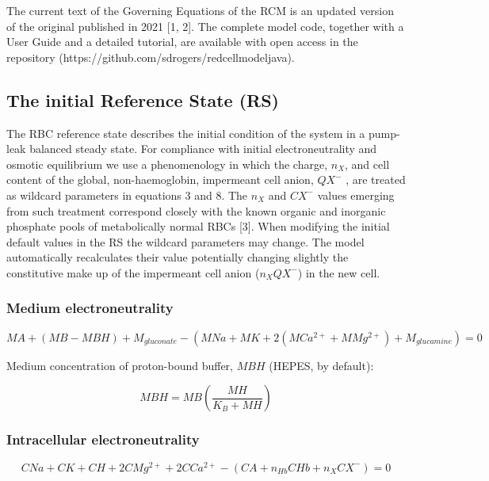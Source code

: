 \documentclass[a4paper]{article}
\newcommand{\med}[1]{M#1}
\newcommand{\cell}[1]{C#1}
\newcommand{\MA}{\med{A}}
\newcommand{\MB}{\med{B}}
\newcommand{\MBH}{\med{BH}}
\newcommand{\MGluca}{M_{glucamine}}
\newcommand{\MNa}{\med{Na}}
\newcommand{\MK}{\med{K}}
\newcommand{\MCatp}{\med{Ca^{2+}}}
\newcommand{\MMgtp}{\med{Mg^{2+}}}
\newcommand{\MGluco}{M_{gluconate}}
\newcommand{\MH}{\med{H}}
\newcommand{\KB}{K_B}
\newcommand{\CNa}{\cell{Na}}
\newcommand{\CK}{\cell{K}}
\newcommand{\CH}{\cell{H}}
\newcommand{\CMgtp}{\cell{Mg^{2+}}}
\newcommand{\CCatp}{\cell{Ca^{2+}}}
\newcommand{\CA}{\cell{A}}
\newcommand{\nHb}{n_{Hb}}
\newcommand{\CHb}{\cell{Hb}}
\newcommand{\nX}{n_{X}}
\newcommand{\CXm}{\cell{X^{-}}}
\newcommand{\QXm}{QX^{-}}
\begin{document}
The current text of the Governing Equations of the RCM is an updated version of the original published in 2021 [1, 2]. The complete model code, together with a User Guide and a detailed tutorial, are available 
 with open access in the repository (https://github.com/sdrogers/redcellmodeljava).   


\subsection{The initial Reference State (RS)}

The RBC reference state describes the initial condition of the system in
a pump-leak balanced steady state. For compliance with initial
electroneutrality and osmotic equilibrium we use a phenomenology in
which the charge, $\nX$, and cell content of the global, non-haemoglobin,
impermeant cell anion, $\QXm$ , are treated as wildcard parameters in
equations 3 and 8. The $\nX$ and $\CXm$ values emerging from such treatment
correspond closely with the known organic and inorganic phosphate pools
of metabolically normal RBCs {[}3{]}. When modifying the initial default
values in the RS the wildcard parameters may change. The model
automatically recalculates their value potentially changing slightly the
constitutive make up of the impermeant cell anion ($\nX  \QXm$) in
the new cell.

\subsubsection{Medium electroneutrality}\label{medium-electroneutrality}

\begin{equation}
\MA + (\MB - \MBH) + \MGluco-(\MNa + \MK + 2(\MCatp + \MMgtp) + \MGluca) = 0 \tag{1}
\end{equation}

Medium concentration of proton-bound buffer, $\MBH$ (HEPES, by default):

\setcounter{equation}{1}

\begin{equation}
\MBH = \MB\left(\frac{\MH}{\KB + \MH}\right)
\end{equation}

\subsubsection{Intracellular electroneutrality}

\begin{equation}
\CNa + \CK + \CH + 2\CMgtp + 2\CCatp - (\CA + \nHb\CHb + \nX\CXm) = 0
\end{equation}
\end{document}
